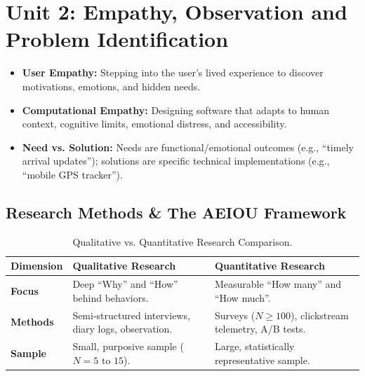 \chapter{Unit 2: Empathy, Observation and Problem Identification}
\label{chap:unit2_rev}

\begin{revbox}
\begin{itemize}[leftmargin=1.2em, itemsep=2pt]
    \item \textbf{User Empathy:} Stepping into the user's lived experience to discover motivations, emotions, and hidden needs.
    \item \textbf{Computational Empathy:} Designing software that adapts to human context, cognitive limits, emotional distress, and accessibility.
    \item \textbf{Need vs. Solution:} Needs are functional/emotional outcomes (e.g., ``timely arrival updates''); solutions are specific technical implementations (e.g., ``mobile GPS tracker'').
\end{itemize}
\end{revbox}

\section{Research Methods \& The AEIOU Framework}

\begin{table}[h!]
\centering
\small
\renewcommand{\arraystretch}{1.3}
\begin{tabularx}{\linewidth}{p{2.8cm}X X}
\toprule
\textbf{Dimension} & \textbf{Qualitative Research} & \textbf{Quantitative Research} \\
\midrule
\textbf{Focus} & Deep ``Why'' and ``How'' behind behaviors. & Measurable ``How many'' and ``How much''. \\
\textbf{Methods} & Semi-structured interviews, diary logs, observation. & Surveys ($N \ge 100$), clickstream telemetry, A/B tests. \\
\textbf{Sample} & Small, purposive sample ($N = 5 \text{ to } 15$). & Large, statistically representative sample. \\
\bottomrule
\end{tabularx}
\caption{Qualitative vs. Quantitative Research Comparison.}
\end{table}

